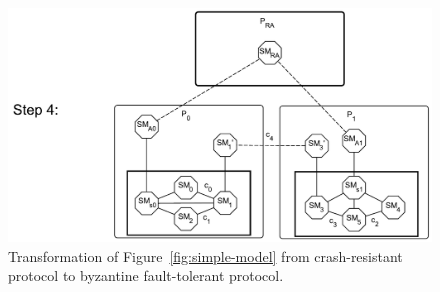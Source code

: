 \documentclass{article}
\begin{document}
	\begin{figure}[ht!]
		\center
		\includegraphics[scale=0.40]{figures/state-machines/distributed-protocol-model-transformation4.pdf}
		\caption{Transformation of Figure~\ref{fig:simple-model} from crash-resistant protocol to byzantine fault-tolerant protocol.}
		\label{fig:tranformation-model}
	\end{figure}
	\FloatBarrier
\end{document}
